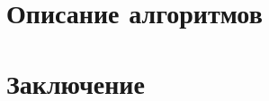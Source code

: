 \documentclass[main.tex]{subfiles}
\begin{document}
	\section{Описание алгоритмов}
	\section{Заключение}
\end{document}
